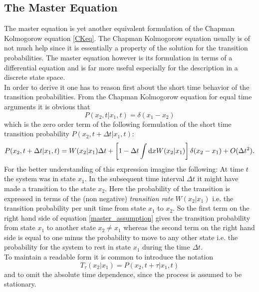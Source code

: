 \subsection{The Master Equation}
\label{The_Master_Equation}
The master equation is yet another equivalent formulation of the Chapman Kolmogorow equation \eqref{CKeq}. The Chapman Kolmogorow equation usually is of not much help since it is essentially a property of the solution for the transition probabilities. The master equation however is its formulation in terms of a differential equation and is far more useful especially for the description in a discrete state space. \\
In order to derive it one has to reason first about the short time behavior of the transition probabilities. From the Chapman Kolmogorow equation for equal time arguments it is obvious that
\begin{equation}
    P(x_2,t|x_1,t) = \delta(x_1-x_2)
    \label{leading_order}
\end{equation}
which is the zero order term of the following formulation of the short time transition probability $P(x_2,t+\Delta t|x_1,t)$:
\begin{equation}
    P(x_2,t+\Delta t|x_1,t) = W(x_2|x_1)\Delta t + \left[ 1 - \Delta t \int {\rm d} x W(x_2|x_1) \right] \delta(x_2-x_1) + O(\Delta t ^{2}).
    \label{master_assumption}
\end{equation}
For the better understanding of this expression imagine the following: At time $t$ the system was in state $x_1$. In the subsequent time interval $\Delta t$ it might have made a transition to the state $x_2$.
Here the probability of the transition is expressed in terms of the (non negative) {\it transition rate}  $W(x_2|x_1)$ i.e. the transition probability per unit time from state $x_1$ to $x_2$. So the first term on the right hand side of equation \eqref{master_assumption} gives the transition probability from state $x_1$ to another state $x_2 \ne x_1$ whereas the second term on the right hand side is equal to one minus the probability to move to any other state i.e. the probability for the system to rest in state $x_1$ during the time $\Delta t$.\\
To maintain a readable form it is common to introduce the notation
\begin{equation}
    T_\tau (x_2|x_1) = P(x_2,t+\tau|x_1,t)
\end{equation}
and to omit the absolute time dependence, since the process is assumed to be stationary. \\
